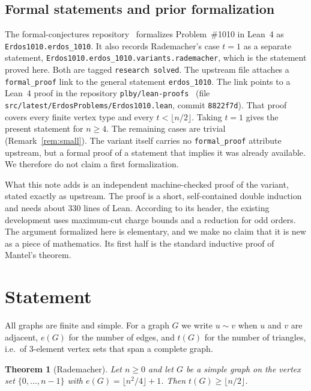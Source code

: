 \documentclass[11pt]{amsart}
\theoremstyle{plain}
\newtheorem{theorem}{Theorem}
\theoremstyle{definition}
\newcommand{\adj}{\sim}
\begin{document}
\subsection*{Formal statements and prior formalization}
The formal-conjectures repository~\cite{FC} formalizes Problem~\#1010 in Lean~4 as
\texttt{Erdos1010.erdos\_1010}. It also records Rademacher's case $t=1$ as a separate statement,
\texttt{Erdos1010.erdos\_1010.variants.rademacher}, which is the statement proved here. Both are
tagged \texttt{research solved}. The upstream file attaches a \texttt{formal\_proof} link to the
general statement \texttt{erdos\_1010}. The link points to a Lean~4 proof in the repository
\texttt{plby/lean-proofs}~\cite{plby} (file
\nolinkurl{src/latest/ErdosProblems/Erdos1010.lean}, commit \texttt{8822f7d}). That proof covers
every finite vertex type and every $t<\lfloor n/2\rfloor$. Taking $t=1$ gives the present
statement for $n\ge 4$. The remaining cases are trivial (Remark~\ref{rem:small}). The variant
itself carries no \texttt{formal\_proof} attribute upstream, but a formal proof of a statement
that implies it was already available. We therefore do not claim a first formalization.

What this note adds is an independent machine-checked proof of the variant, stated exactly as
upstream. The proof is a short, self-contained double induction and needs about 330 lines of
Lean. According to its header, the existing development uses maximum-cut charge bounds and a
reduction for odd orders. The argument formalized here is elementary, and we make no claim that it
is new as a piece of mathematics. Its first half is the standard inductive proof of Mantel's
theorem.

\section{Statement}

All graphs are finite and simple. For a graph $G$ we write $u\adj v$ when $u$ and $v$ are
adjacent, $e(G)$ for the number of edges, and $t(G)$ for the number of triangles, i.e.\ of
$3$-element vertex sets that span a complete graph.

\begin{theorem}[Rademacher]\label{thm:main}
Let $n\ge 0$ and let $G$ be a simple graph on the vertex set $\{0,\dots,n-1\}$ with
$e(G)=\lfloor n^2/4\rfloor+1$. Then $t(G)\ge\lfloor n/2\rfloor$.
\end{theorem}
\end{document}

